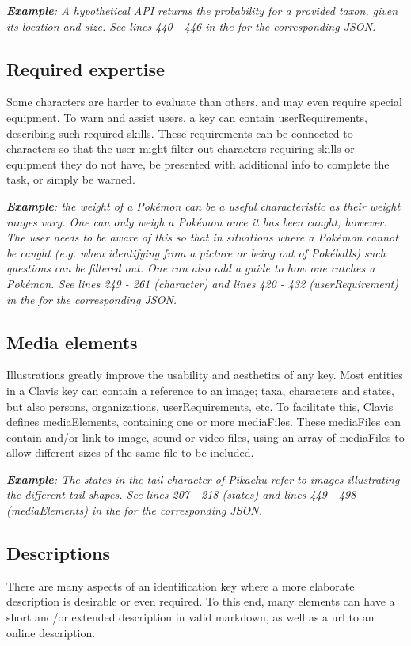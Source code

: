 \documentclass[10pt,letterpaper]{article}
\begin{document}
\textit{\textbf{Example}: A hypothetical API returns the probability for a provided taxon, given its location and size. See lines 440 - 446 in the  for the corresponding JSON.}
\subsection*{
Required expertise
}
Some characters are harder to evaluate than others, and may even require special equipment. To warn and assist users, a key can contain userRequirements, describing such required skills. These requirements can be connected to characters so that the user might filter out characters requiring skills or equipment they do not have, be presented with additional info to complete the task, or simply be warned.

\textit{\textbf{Example}: the weight of a Pokémon can be a useful characteristic as their weight ranges vary. One can only weigh a Pokémon once it has been caught, however. The user needs to be aware of this so that in situations where a Pokémon cannot be caught (e.g. when identifying from a picture or being out of Pokéballs) such questions can be filtered out. One can also add a guide to how one catches a Pokémon. See lines 249 - 261 (character) and lines 420 - 432 (userRequirement) in the  for the corresponding JSON.}

\subsection*{
Media elements
}
Illustrations greatly improve the usability and aesthetics of any key. Most entities in a Clavis key can contain a reference to an image; taxa, characters and states, but also persons, organizations, userRequirements, etc. To facilitate this, Clavis defines mediaElements, containing one or more mediaFiles. These mediaFiles can contain and/or link to image, sound or video files, using an array of mediaFiles to allow different sizes of the same file to be included.

\textit{\textbf{Example}: The states in the tail character of Pikachu refer to images illustrating the different tail shapes. See lines 207 - 218 (states) and lines 449 - 498 (mediaElements) in the  for the corresponding JSON.}
\subsection*{
Descriptions
}
There are many aspects of an identification key where a more elaborate description is desirable or even required. To this end, many elements can have a short and/or extended description in valid markdown, as well as a url to an online description.
\end{document}
